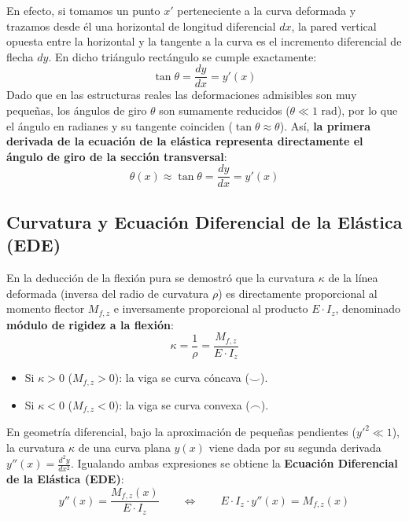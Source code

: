 En efecto, si tomamos un punto $x'$ perteneciente a la curva deformada y trazamos desde él una horizontal de longitud diferencial $dx$, la pared vertical opuesta entre la horizontal y la tangente a la curva es el incremento diferencial de flecha $dy$. En dicho triángulo rectángulo se cumple exactamente:
\begin{equation}
    \tan\theta = \frac{dy}{dx} = y'(x)
\end{equation}
Dado que en las estructuras reales las deformaciones admisibles son muy pequeñas, los ángulos de giro $\theta$ son sumamente reducidos ($\theta \ll 1\text{ rad}$), por lo que el ángulo en radianes y su tangente coinciden ($\tan\theta \approx \theta$). Así, \textbf{la primera derivada de la ecuación de la elástica representa directamente el ángulo de giro de la sección transversal}:
\begin{equation}
    \boxed{\theta(x) \approx \tan\theta = \frac{dy}{dx} = y'(x)}
\end{equation}

\subsection{Curvatura y Ecuación Diferencial de la Elástica (EDE)}

En la deducción de la flexión pura se demostró que la curvatura $\kappa$ de la línea deformada (inversa del radio de curvatura $\rho$) es directamente proporcional al momento flector $M_{f,z}$ e inversamente proporcional al producto $E \cdot I_z$, denominado \textbf{módulo de rigidez a la flexión}:
\begin{equation}
    \kappa = \frac{1}{\rho} = \frac{M_{f,z}}{E \cdot I_z}
\end{equation}
\begin{itemize}
    \item Si $\kappa > 0$ ($M_{f,z} > 0$): la viga se curva cóncava ($\smile$).
    \item Si $\kappa < 0$ ($M_{f,z} < 0$): la viga se curva convexa ($\frown$).
\end{itemize}
En geometría diferencial, bajo la aproximación de pequeñas pendientes ($y'^2 \ll 1$), la curvatura $\kappa$ de una curva plana $y(x)$ viene dada por su segunda derivada $y''(x) = \frac{d^2y}{dx^2}$. Igualando ambas expresiones se obtiene la \textbf{Ecuación Diferencial de la Elástica (EDE)}:
\begin{equation}
    \boxed{y''(x) = \frac{M_{f,z}(x)}{E \cdot I_z}} \qquad \Longleftrightarrow \qquad E \cdot I_z \cdot y''(x) = M_{f,z}(x)
    \label{eq:ede_fundamental}
\end{equation}

